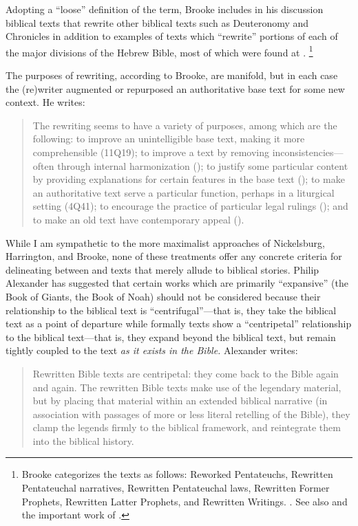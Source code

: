     \autocite[777]{brooke_schiffman-vanderkam2000}
Adopting a ``loose'' definition of the term, Brooke includes in his discussion biblical texts that rewrite other biblical texts such as Deuteronomy and Chronicles in addition to examples of texts which ``rewrite'' portions of each of the major divisions of the Hebrew Bible, most of which were found at \qumran.%
    \footnote{Brooke categorizes the texts as follows: Reworked Pentateuchs, Rewritten Pentateuchal narratives, Rewritten Pentateuchal laws, Rewritten Former Prophets, Rewritten Latter Prophets, and Rewritten Writings.
        \cite[778--780]{brooke_schiffman-vanderkam2000}. See also 
        \cite{brooke_herbert-tov2002} and the important work of 
        \cite{falk2007}.}

The purposes of rewriting, according to Brooke, are manifold, but in each case the (re)writer augmented or repurposed an authoritative base text for some new context. He writes: 

\begin{quote}
    The rewriting seems to have a variety of purposes, among which are the following: to improve an unintelligible base text, making it more comprehensible (11Q19); to improve a text by removing inconsistencies---often through internal harmonization (); to justify some particular content by providing explanations for certain features in the base text (); to make an authoritative text serve a particular function, perhaps in a liturgical setting (4Q41); to encourage the practice of particular legal rulings (\jub); and to make an old text have contemporary appeal (\templescroll).%
    \autocite[778]{brooke_schiffman-vanderkam2000}
\end{quote} 

While I am sympathetic to the more maximalist approaches of Nickelsburg, Harrington, and Brooke, none of these treatments offer any concrete criteria for delineating between \rwb and texts that merely allude to biblical stories. Philip Alexander has suggested that certain works which are primarily ``expansive'' (the Book of Giants, the Book of Noah) should not be considered \rwb because their relationship to the biblical text is ``centrifugal''---that is, they take the biblical text as a point of departure while formally \rwb texts show a ``centripetal'' relationship to the biblical text---that is, they expand beyond the biblical text, but remain tightly coupled to the text \emph{as it exists in the Bible.} Alexander writes: 

\begin{quote}
    Rewritten Bible texts are centripetal: they come back to the Bible again and again. The rewritten Bible texts make use of the legendary material, but by placing that material within an extended biblical narrative (in association with passages of more or less literal retelling of the Bible), they clamp the legends firmly to the biblical framework, and reintegrate them into the biblical history.%
    \autocite[117]{alexander_carson-williamson1988}
\end{quote} 

